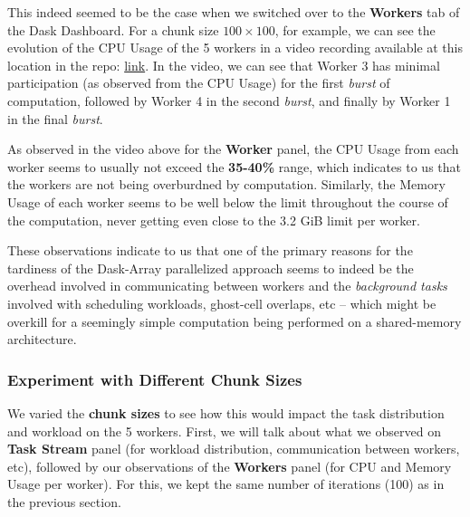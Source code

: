 \documentclass[a4paper,12pt]{article}
\begin{document}
This indeed seemed to be the case when we switched over to the \textbf{Workers} tab of the Dask Dashboard. For a chunk size $100 \times 100$, for example, we can see the evolution of the CPU Usage of the 5 workers in a video recording available at this location in the repo: \href{https://github.com/paulmyr/DD2358-HPC25/tree/master/04_parallel/bonus#chunk-size-100}{link}. In the video, we can see that Worker 3 has minimal participation (as observed from the CPU Usage) for the first \textit{burst} of computation, followed by Worker 4 in the second \textit{burst}, and finally by Worker 1 in the final \textit{burst}.

As observed in the video above for the \textbf{Worker} panel, the CPU Usage from each worker seems to usually not exceed the \textbf{35-40\%} range, which indicates to us that the workers are not being overburdned by computation. Similarly, the Memory Usage of each worker seems to be well below the limit throughout the course of the computation, never getting even close to the 3.2 GiB limit per worker.

These observations indicate to us that one of the primary reasons for the tardiness of the Dask-Array parallelized approach seems to indeed be the overhead involved in communicating between workers and the \textit{background tasks} involved with scheduling workloads, ghost-cell overlaps, etc -- which might be overkill for a seemingly simple computation being performed on a shared-memory architecture.

\subsubsection{Experiment with Different Chunk Sizes}
We varied the \textbf{chunk sizes} to see how this would impact the task distribution and workload on the 5 workers. First, we will talk about what we observed on \textbf{Task Stream} panel (for workload distribution, communication between workers, etc), followed by our observations of the \textbf{Workers} panel (for CPU and Memory Usage per worker). For this, we kept the same number of iterations (100) as in the previous section.
\end{document}
